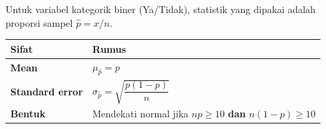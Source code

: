 \documentclass[
  indonesian,
  letterpaper,
]{book}
\newcounter{none} %
\begin{document}
Untuk variabel kategorik biner (Ya/Tidak), statistik yang dipakai adalah
proporsi sampel \(\hat{p} = x/n\).

{\def\LTcaptype{none} %
\begin{longtable}[]{@{}
  >{\raggedright\arraybackslash}p{}
  >{\raggedright\arraybackslash}p{}@{}}
\toprule\noalign{}
\begin{minipage}[b]{\linewidth}\raggedright
Sifat
\end{minipage} & \begin{minipage}[b]{\linewidth}\raggedright
Rumus
\end{minipage} \\
\midrule\noalign{}
\endhead
\bottomrule\noalign{}
\endlastfoot
\textbf{Mean} & \(\mu_{\hat{p}} = p\) \\
\textbf{Standard error} &
\(\sigma_{\hat{p}} = \sqrt{\dfrac{p(1-p)}{n}}\) \\
\textbf{Bentuk} & Mendekati normal jika \(np \geq 10\) \textbf{dan}
\(n(1-p) \geq 10\) \\
\end{longtable}
}
\end{document}
